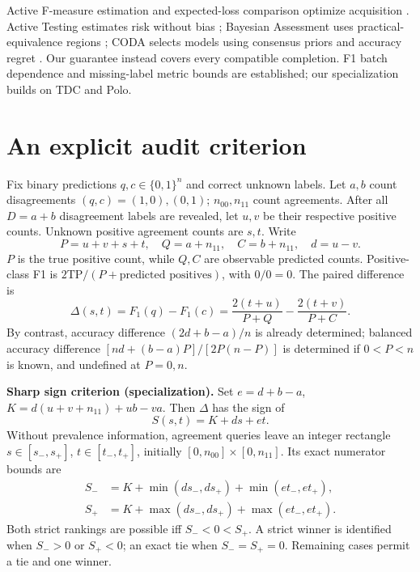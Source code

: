 \documentclass[a4paper]{esannV2}
\newcommand{\F}{F_1}
\begin{document}
Active F-measure estimation and expected-loss comparison optimize acquisition
\cite{sawade2010,sawade2012}. Active Testing estimates risk without bias
\cite{kossen2021}; Bayesian Assessment uses practical-equivalence regions
\cite{ji2021}; CODA selects models using consensus priors and accuracy regret
\cite{kay2025}. Our guarantee instead covers every compatible completion.
F1 batch dependence \cite{lipton2014} and missing-label metric bounds
\cite{dervovic2025} are established; our specialization builds on TDC and Polo.

\section{An explicit audit criterion}
Fix binary predictions $q,c\in\{0,1\}^n$ and correct unknown labels.
Let $a,b$ count disagreements $(q,c)=(1,0),(0,1)$;
$n_{00},n_{11}$ count agreements. After all $D=a+b$ disagreement labels are
revealed, let $u,v$ be their respective positive counts. Unknown positive
agreement counts are $s,t$. Write
\[
 P=u+v+s+t,\quad Q=a+n_{11},\quad C=b+n_{11},\quad d=u-v.
\]
$P$ is the true positive count, while $Q,C$ are observable predicted counts.
Positive-class F1 is $2\mathrm{TP}/(P+\text{predicted positives})$, with
$0/0=0$. The paired difference is
\begin{equation}\label{eq:gap}
 \Delta(s,t)=\F(q)-\F(c)=\frac{2(t+u)}{P+Q}-\frac{2(t+v)}{P+C}.
\end{equation}
By contrast, accuracy difference $(2d+b-a)/n$ is already determined;
balanced accuracy difference $[nd+(b-a)P]/[2P(n-P)]$ is determined if
$0<P<n$ is known, and undefined at $P=0,n$.

\noindent\textbf{Sharp sign criterion (specialization).}
Set $e=d+b-a$, $K=d(u+v+n_{11})+ub-va$. Then $\Delta$ has the sign of
\begin{equation}\label{eq:affine}
 S(s,t)=K+ds+et.
\end{equation}
Without prevalence information, agreement queries leave an integer rectangle
$s\in[s_-,s_+]$, $t\in[t_-,t_+]$, initially $[0,n_{00}]\times[0,n_{11}]$.
Its exact numerator bounds are
\begin{align}\label{eq:bounds}
 S_-&=K+\min(ds_-,ds_+)+\min(et_-,et_+),\nonumber\\
 S_+&=K+\max(ds_-,ds_+)+\max(et_-,et_+).
\end{align}
Both strict rankings are possible iff $S_-<0<S_+$. A strict winner is
identified when $S_->0$ or $S_+<0$; an exact tie when $S_-=S_+=0$.
Remaining cases permit a tie and one winner.
\end{document}
